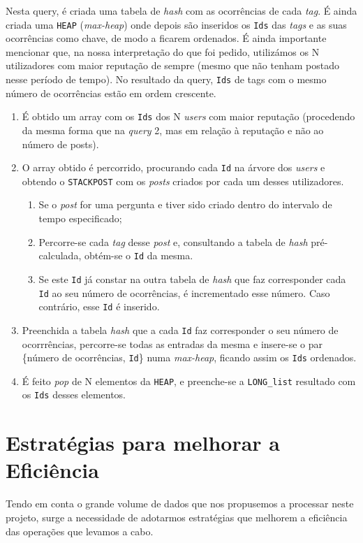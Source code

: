 \documentclass[10pt]{article}
\begin{document}
			Nesta query, é criada uma tabela de \textit{hash} com as ocorrências de cada
		\textit{tag}. É ainda criada uma \texttt{HEAP} (\textit{max-heap}) onde depois são inseridos
		os \texttt{Ids} das \textit{tags} e as suas ocorrências como chave, de modo a ficarem 
		ordenados.
			É ainda importante mencionar que, na nossa interpretação do que foi pedido,
		utilizámos os N utilizadores com maior reputação de sempre (mesmo que não tenham
		postado nesse período de tempo). No resultado da query, \texttt{Ids} de tags com
		o mesmo número de ocorrências estão em ordem crescente.		
		
			\begin{enumerate}
				\item É obtido um array com os \texttt{Ids} dos N \textit{users} com
					maior reputação (procedendo da mesma forma que na \textit{query} 2, mas em
					relação à reputação e não ao número de posts).
				\item O array obtido é percorrido, procurando cada \texttt{Id} na árvore dos
					\textit{users} e obtendo  o \texttt{STACKPOST} com os \textit{posts}
					criados por cada um desses utilizadores.
					\begin{enumerate}
						\item Se o \textit{post} for uma pergunta e tiver sido criado dentro
							do intervalo de tempo especificado;
						\item Percorre-se cada \textit{tag} desse \textit{post} e, consultando 
						 a tabela de \textit{hash} pré-calculada, obtém-se o \texttt{Id} da mesma.
						\item Se este \texttt{Id} já constar na outra tabela de \textit{hash} que
							faz corresponder cada \texttt{Id} ao seu número de ocorrências, é 
							incrementado esse número. Caso contrário, esse \texttt{Id} é inserido.
					\end{enumerate}
				\item Preenchida a tabela \textit{hash} que a cada \texttt{Id} faz corresponder
				o seu número de ocorrrências, percorre-se todas as entradas da mesma e insere-se
				o par \{número de ocorrências, \texttt{Id}\} numa \textit{max-heap}, ficando assim
				os \texttt{Ids} ordenados.
				\item É feito \textit{pop} de N elementos da \texttt{HEAP}, e preenche-se a
				\texttt{LONG\_list} resultado com os \texttt{Ids} desses elementos.
			\end{enumerate}
\pagebreak

\section{Estratégias para melhorar a Eficiência}
		Tendo em conta o grande volume de dados que nos propusemos a processar neste projeto,
	surge a necessidade de adotarmos estratégias que melhorem a eficiência das operações que
	levamos a cabo.
	
\end{document}
